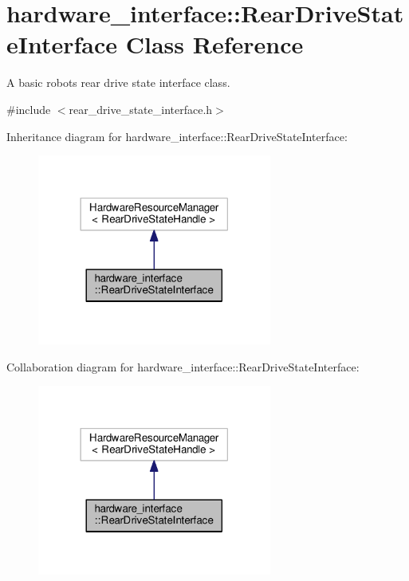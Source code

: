 \hypertarget{classhardware__interface_1_1RearDriveStateInterface}{}\section{hardware\+\_\+interface\+:\+:Rear\+Drive\+State\+Interface Class Reference}
\label{classhardware__interface_1_1RearDriveStateInterface}


A basic robot\textquotesingle{}s rear drive state interface class.  




{\ttfamily \#include $<$rear\+\_\+drive\+\_\+state\+\_\+interface.\+h$>$}



Inheritance diagram for hardware\+\_\+interface\+:\+:Rear\+Drive\+State\+Interface\+:\nopagebreak
\begin{figure}[H]
\begin{center}
\leavevmode
\includegraphics[width=218pt]{classhardware__interface_1_1RearDriveStateInterface__inherit__graph}
\end{center}
\end{figure}


Collaboration diagram for hardware\+\_\+interface\+:\+:Rear\+Drive\+State\+Interface\+:\nopagebreak
\begin{figure}[H]
\begin{center}
\leavevmode
\includegraphics[width=218pt]{classhardware__interface_1_1RearDriveStateInterface__coll__graph}
\end{center}
\end{figure}


